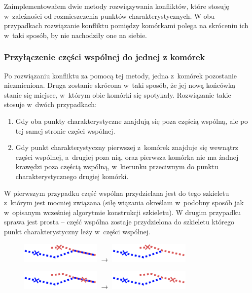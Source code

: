 \documentclass[declaration,shortabstract,mgr]{iithesis}
\begin{document}
Zaimplementowałem dwie metody rozwiązywania konfliktów, które stosuję w~zależności od rozmieszczenia punktów charakterystycznych.
W obu przypadkach rozwiązanie konfliktu pomiędzy komórkami polega na skróceniu ich w~taki sposób, by nie nachodziły one na siebie.

\subsubsection{Przyłączenie części wspólnej do jednej z komórek}

Po rozwiązaniu konfliktu za pomocą tej metody, jedna z~komórek pozostanie niezmieniona.
Druga zostanie skrócona w~taki sposób, że jej nową końcówką stanie się miejsce, w~którym obie komórki się spotykały.
Rozwiązanie takie stosuje w~dwóch przypadkach:
\begin{enumerate}
  \item Gdy oba punkty charakterystyczne znajdują się poza częścią wspólną, ale po tej samej stronie części wspólnej.
  \item Gdy punkt charakterystyczny pierwszej z~komórek znajduje się wewnątrz części wspólnej, a~drugiej poza nią, oraz pierwsza komórka nie ma żadnej krawędzi poza częścią wspólną, w~kierunku przeciwnym do punktu charakterystycznego drugiej komórki.
\end{enumerate}

W pierwszym przypadku część wspólna przydzielana jest do tego szkieletu z~którym jest mocniej związana (siłę wiązania określam w~podobny sposób jak w~opisanym wcześniej algorytmie konstrukcji szkieletu).
W drugim przypadku sprawa jest prosta -- część wspólna zostaje przydzielona do szkieletu którego punkt charakterystyczny leży w~części wspólnej.

\begin{figure}[H]
  \centering
  \includegraphics[valign=m,width=0.35\textwidth]{images/overlap-out-out-assign.png}
  $\rightarrow$
  \includegraphics[valign=m,width=0.35\textwidth]{images/overlap-out-out-assign-solved.png}
\end{figure}

\begin{figure}[H]
  \centering
  \includegraphics[valign=m,width=0.35\textwidth]{images/overlap-out-in-assign.png}
  $\rightarrow$
  \includegraphics[valign=m,width=0.35\textwidth]{images/overlap-out-in-assign-solved.png}
\end{figure}
\end{document}
